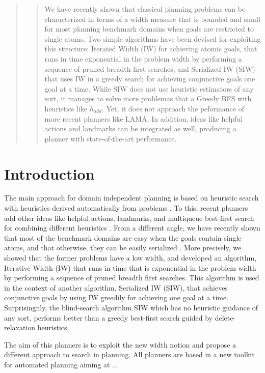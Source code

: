 \documentclass[letterpaper]{article}
\begin{document}
\begin{abstract}
\begin{quote}
We have recently shown that classical planning problems can be
characterized in terms of a width measure that is bounded and small
for most planning benchmark domains when goals are restricted to
single atoms. Two simple algorithms have been devised for exploiting
this structure: Iterated Width (IW) for achieving atomic goals, that
runs in time exponential in the problem width by performing a sequence
of pruned breadth first searches, and Serialized IW (SIW) that uses IW
in a greedy search for achieving conjunctive goals one goal at a time.
While SIW does not use heuristic estimators of any sort, it manages to
solve more problemas that a Greedy BFS with heuristics like
$h_{add}$. Yet, it does not approach the peformance of more recent
planners like LAMA. In addition, ideas like helpful actions and
landmarks can be integrated as well, producing a planner with
state-of-the-art performance.
\end{quote}
\end{abstract}

\section{Introduction}

The main approach for domain independent planning is based on 
heuristic search with heuristics derived automatically from problems
\cite{mcdermott:unpop,bonet:aij-hsp}. To this, recent planners 
add other ideas like helpful actions,  landmarks, and
multiqueue best-first  search for  combining  different heuristics
\cite{hoffmann:ff,helmert:fd,richter:lama:aij}. 
From a different angle, we have recently shown that most of the benchmark 
domains are easy when the goals contain single atoms,
and that otherwise, they can be easily serialized
\cite{nir:ecai12}. More precisely, we showed that the former
problems have a low width, and developed  an algorithm, 
Iterative Width (IW) that runs in time that
is exponential in the problem width by performing
a sequence of pruned breadth first searches. 
This  algorithm is used in the context of another algorithm,
Serialized IW (SIW),  that achieves conjunctive goals
by using IW greedily for achieving one goal at a time.
Surprisingnly,  the blind-search algorithm SIW
which has no heuristic guidance of any sort, performs better
than a greedy best-first search guided by delete-relaxation
heuristics.

The aim of this planners is to exploit the new width notion and
propose a different approach to search in planning. All planners are
based in a new toolkit for automated planning \cite{} aiming at ...
\end{document}
